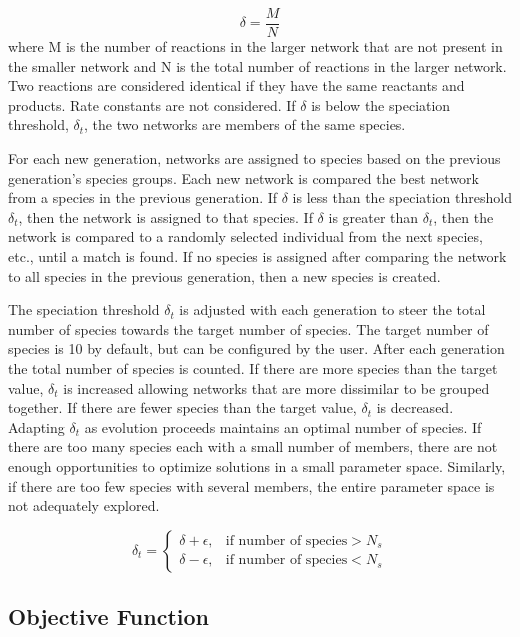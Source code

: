 \documentclass[12pt]{report}
\begin{document}
\begin{equation}
\delta=\frac{M}{N}
\end{equation}
where M is the number of reactions in the larger network that are not present in the smaller network and N is the total number of reactions in the larger network. Two reactions are considered identical if they have the same reactants and products. Rate constants are not considered. If $\delta$ is below the speciation threshold, $\delta_{t}$, the two networks are members of the same species.

For each new generation, networks are assigned to species based on the previous generation's species groups. Each new network is compared the best network from a species in the previous generation. If $\delta$ is less than the speciation threshold $\delta_{t}$, then the network is assigned to that species. If $\delta$ is greater than $\delta_{t}$, then the network is compared to a randomly selected individual from the next species, etc., until a match is found. If no species is assigned after comparing the network to all species in the previous generation, then a new species is created. 

The speciation threshold $\delta_{t}$ is adjusted with each generation to steer the total number of species towards the target number of species. The target number of species is 10 by default, but can be configured by the user. After each generation the total number of species is counted. If there are more species than the target value, $\delta_{t}$ is increased allowing networks that are more dissimilar to be grouped together. If there are fewer species than the target value, $\delta_{t}$ is decreased. Adapting $\delta_{t}$ as evolution proceeds maintains an optimal number of species. If there are too many species each with a small number of members, there are not enough opportunities to optimize solutions in a small parameter space. Similarly, if there are too few species with several members, the entire parameter space is not adequately explored. 

\begin{equation}
	\delta_{t} = \begin{cases}\delta+\epsilon,& \mbox{if number of species} > N_{s} \\
	\delta-\epsilon,& \mbox{if number of species} < N_{s}
	\end{cases}
\end{equation}

\subsection{Objective Function}
\end{document}
